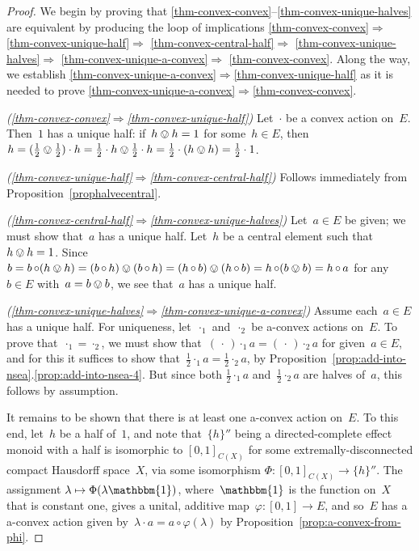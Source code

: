 \documentclass[a4paper, onecolumn, accepted=2020-12-22]{quantumarticle}
\newcommand{\mult}{\mathop{\circ}}
\theoremstyle{definition}
\begin{document}
\begin{proof}
We begin by proving that
  \ref{thm-convex-convex}--\ref{thm-convex-unique-halves}
  are equivalent by producing the loop of implications
\ref{thm-convex-convex}$\Rightarrow$%
\ref{thm-convex-unique-half}$\Rightarrow$%
\ref{thm-convex-central-half}$\Rightarrow$%
\ref{thm-convex-unique-halves}$\Rightarrow$%
\ref{thm-convex-unique-a-convex}$\Rightarrow$%
\ref{thm-convex-convex}.
Along the way, we establish 
\ref{thm-convex-unique-a-convex}$\Rightarrow$\ref{thm-convex-unique-half}
as it is needed to prove
  \ref{thm-convex-unique-a-convex}$\Rightarrow$\ref{thm-convex-convex}.

  \emph{(\ref{thm-convex-convex}$\Rightarrow$\ref{thm-convex-unique-half})}
Let~$\cdot$ be a convex action on~$E$.
Then~$1$ has a unique half:
 if~$h \ovee h = 1$ for some~$h\in E$,
    then~$h = (\frac{1}{2}\ovee\frac{1}{2})\cdot h
    =\frac{1}{2} \cdot h \ovee \frac{1}{2}\cdot h
        = \frac{1}{2}\cdot (h \ovee h) = \frac{1}{2} \cdot 1$.

\emph{(\ref{thm-convex-unique-half}$\Rightarrow$\ref{thm-convex-central-half})}
Follows immediately from Proposition~\ref{prophalvecentral}.

\emph{(\ref{thm-convex-central-half}$\Rightarrow%
$\ref{thm-convex-unique-halves})}
Let~$a\in E$ be given; we must show that~$a$ has a unique half.
Let~$h$ be a central element such that~$h\ovee h=1$.
Since~$b= b\mult (h\ovee h)
  = (b\mult h) \ovee (b\mult h)
  = (h\mult b) \ovee (h\mult b)
  = h \mult (b\ovee b) = h\mult a$
  for any~$b\in E$ with~$a=b\ovee b$,
  we see that~$a$ has a unique half.

\emph{(\ref{thm-convex-unique-halves}$\Rightarrow%
$\ref{thm-convex-unique-a-convex})}
Assume each~$a\in E$ has a unique half.
For uniqueness,
let~$\cdot_1$ and~$\cdot_2$ be a-convex actions on~$E$.
To prove that~$\cdot_1=\cdot_2$,
we must show that~$(\,\cdot\,)\cdot_1 a
= (\,\cdot\,)\cdot_2 a$ for given~$a\in E$,
and for this it suffices to
show that~$\frac{1}{2} \cdot_1 a = \frac{1}{2}\cdot_2 a$,
by Proposition~\ref{prop:add-into-nsea}.\ref{prop:add-into-nsea-4}.
But since both $\frac{1}{2}\cdot_1 a$ and~$\frac{1}{2}\cdot_2 a$
are halves of~$a$, this follows by assumption.

It remains to be shown that there is at least one a-convex action on~$E$.
To this end, let~$h$ be a half of~$1$, and note that~$\{h\}''$
being a directed-complete effect monoid with a half
is isomorphic to $[0,1]_{C(X)}$ for some extremally-disconnected
compact Hausdorff space~$X$, via some isomorphism
  $\Phi\colon [0,1]_{C(X)}\to \{h\}''$.
The assignment $\lambda\mapsto \Phi(\lambda\mathbbm{1})$,
  where~$\mathbbm{1}$ is the function on~$X$ that is constant one,
  gives a unital, additive map~$\varphi\colon [0,1]\to E$,
  and so~$E$ has a a-convex action given by~$\lambda\cdot a
  = a\mult \varphi(\lambda)$ by
  Proposition~\ref{prop:a-convex-from-phi}.


\end{proof}
\end{document}
